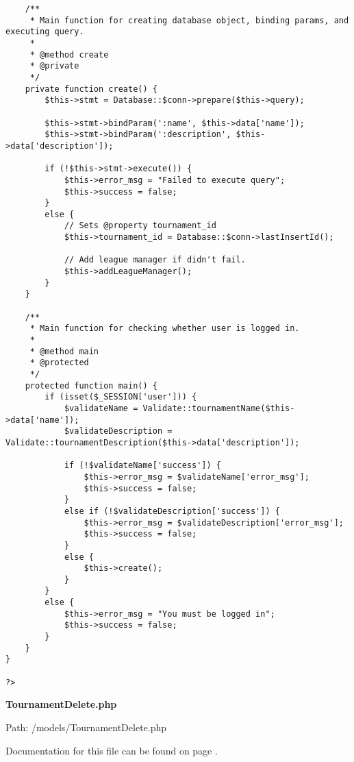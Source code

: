 {\begin{lstlisting}
	/**
	 * Main function for creating database object, binding params, and executing query.
	 *
	 * @method create
	 * @private
	 */
	private function create() {
		$this->stmt = Database::$conn->prepare($this->query);

		$this->stmt->bindParam(':name', $this->data['name']);
		$this->stmt->bindParam(':description', $this->data['description']);

		if (!$this->stmt->execute()) {
			$this->error_msg = "Failed to execute query";
			$this->success = false;
		}
		else {
			// Sets @property tournament_id
			$this->tournament_id = Database::$conn->lastInsertId();

			// Add league manager if didn't fail.
			$this->addLeagueManager();
		}
	}

	/**
	 * Main function for checking whether user is logged in.
	 *
	 * @method main
	 * @protected
	 */
	protected function main() {
		if (isset($_SESSION['user'])) {
			$validateName = Validate::tournamentName($this->data['name']);
			$validateDescription = Validate::tournamentDescription($this->data['description']);

			if (!$validateName['success']) {
				$this->error_msg = $validateName['error_msg'];
				$this->success = false;
			}
			else if (!$validateDescription['success']) {
				$this->error_msg = $validateDescription['error_msg'];
				$this->success = false;
			}
			else {
				$this->create();
			}
		}
		else {
			$this->error_msg = "You must be logged in";
			$this->success = false;
		}
	}
}

?>\end{lstlisting}
}
\textbf{TournamentDelete.php}\label{TournamentDelete.php}

Path: /models/TournamentDelete.php

Documentation for this file can be found on page \pageref{TournamentDelete.php.doc}.

